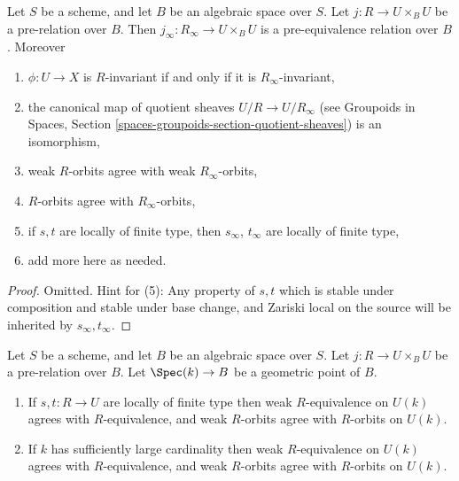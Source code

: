 \begin{lemma}
\label{lemma-make-pre-equivalence}
Let $S$ be a scheme, and let $B$ be an algebraic space over $S$.
Let $j : R \to U \times_B U$ be a pre-relation over $B$.
Then $j_\infty : R_\infty \to U \times_B U$ is a
pre-equivalence relation over $B$. Moreover
\begin{enumerate}
\item $\phi : U \to X$ is $R$-invariant if and only if it is
$R_\infty$-invariant,
\item the canonical map of quotient sheaves $U/R \to U/R_\infty$ (see
Groupoids in Spaces, Section \ref{spaces-groupoids-section-quotient-sheaves})
is an isomorphism,
\item weak $R$-orbits agree with weak $R_\infty$-orbits,
\item $R$-orbits agree with $R_\infty$-orbits,
\item if $s, t$ are locally of finite type, then $s_\infty$, $t_\infty$
are locally of finite type,
\item add more here as needed.
\end{enumerate}
\end{lemma}

\begin{proof}
Omitted. Hint for (5): Any property of $s, t$ which is stable under composition
and stable under base change, and Zariski local on the source
will be inherited by $s_\infty, t_\infty$.
\end{proof}

\begin{lemma}
\label{lemma-geometric-orbits}
Let $S$ be a scheme, and let $B$ be an algebraic space over $S$.
Let $j : R \to U \times_B U$ be a pre-relation over $B$.
Let $\Spec(k) \to B$ be a geometric point of $B$.
\begin{enumerate}
\item If $s, t : R \to U$ are locally of finite type
then weak $R$-equivalence on $U(k)$ agrees with $R$-equivalence, and
weak $R$-orbits agree with $R$-orbits on $U(k)$.
\item If $k$ has sufficiently large cardinality then weak $R$-equivalence
on $U(k)$ agrees with $R$-equivalence, and weak $R$-orbits agree
with $R$-orbits on $U(k)$.
\end{enumerate}
\end{lemma}

